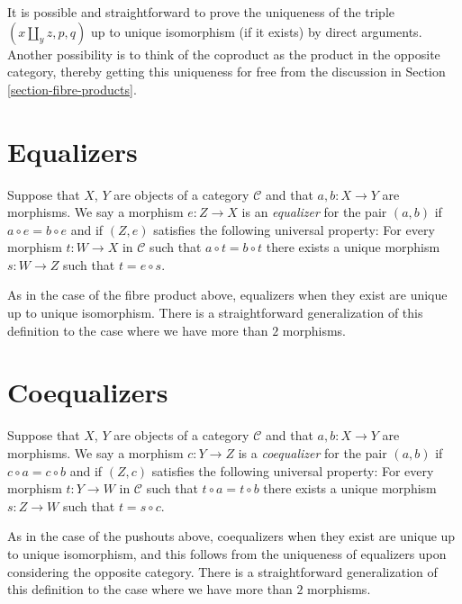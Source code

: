 \noindent
It is possible and straightforward to prove the uniqueness of the triple
$(x\amalg_y z, p, q)$ up to unique isomorphism (if it exists) by direct
arguments. Another possibility is to think of the coproduct as the
product in the opposite category, thereby getting this uniqueness for
free from the discussion in Section \ref{section-fibre-products}.

\section{Equalizers}
\label{section-equalizers}

\begin{definition}
\label{definition-equalizers}
Suppose that $X$, $Y$ are objects of a category $\mathcal{C}$
and that $a, b : X \to Y$ are morphisms. We say a morphism
$e : Z \to X$ is an {\it equalizer} for the pair $(a, b)$ if
$a \circ e = b \circ e$ and if $(Z, e)$ satisfies the following
universal property: For every morphism $t : W \to X$
in $\mathcal{C}$ such that $a \circ t = b \circ t$ there exists
a unique morphism $s : W \to Z$ such that $t = e \circ s$.
\end{definition}

\noindent
As in the case of the fibre product above, equalizers when
they exist are unique up to unique isomorphism. There is a
straightforward generalization of this definition to the
case where we have more than $2$ morphisms.

\section{Coequalizers}
\label{section-coequalizers}

\begin{definition}
\label{definition-coequalizers}
Suppose that $X$, $Y$ are objects of a category $\mathcal{C}$
and that $a, b : X \to Y$ are morphisms. We say a morphism
$c : Y \to Z$ is a {\it coequalizer} for the pair $(a, b)$ if
$c \circ a = c \circ b$ and if $(Z, c)$ satisfies the following
universal property: For every morphism $t : Y \to W$
in $\mathcal{C}$ such that $t \circ a = t \circ b$ there exists
a unique morphism $s : Z \to W$ such that $t = s \circ c$.
\end{definition}

\noindent
As in the case of the pushouts above, coequalizers when
they exist are unique up to unique isomorphism, and this follows
from the uniqueness of equalizers upon considering the opposite
category. There is a straightforward generalization of this definition
to the case where we have more than $2$ morphisms.


